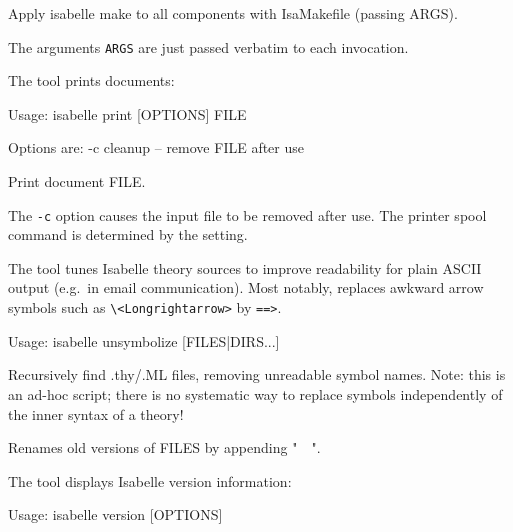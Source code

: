 \begin{isabellebody}
\begin{isamarkuptext}
\begin{ttbox}
  Apply isabelle make to all components with IsaMakefile (passing ARGS).
\end{ttbox}

  The arguments \verb|ARGS| are just passed verbatim to each
  \hyperlink{tool.make}{\mbox{}} invocation.%
\end{isamarkuptext}%
\isamarkuptrue%
%
\isamarkuptrue%
%
\begin{isamarkuptext}%
The \hypertarget{tool.print}{\hyperlink{tool.print}{\mbox{}}} tool prints documents:
\begin{ttbox}
Usage: isabelle print [OPTIONS] FILE

  Options are:
    -c           cleanup -- remove FILE after use

  Print document FILE.
\end{ttbox}

  The \verb|-c| option causes the input file to be removed
  after use.  The printer spool command is determined by the \hyperlink{setting.PRINT-COMMAND}{\mbox{}} setting.%
\end{isamarkuptext}%
\isamarkuptrue%
%
\isamarkuptrue%
%
\begin{isamarkuptext}%
The \hypertarget{tool.unsymbolize}{\hyperlink{tool.unsymbolize}{\mbox{}}} tool tunes Isabelle theory sources to
  improve readability for plain ASCII output (e.g.\ in email
  communication).  Most notably, \hyperlink{tool.unsymbolize}{\mbox{}} replaces awkward
  arrow symbols such as \verb|\|\verb|<Longrightarrow>|
  by \verb|==>|.
\begin{ttbox}
Usage: isabelle unsymbolize [FILES|DIRS...]

  Recursively find .thy/.ML files, removing unreadable symbol names.
  Note: this is an ad-hoc script; there is no systematic way to replace
  symbols independently of the inner syntax of a theory!

  Renames old versions of FILES by appending "~~".
\end{ttbox}%
\end{isamarkuptext}%
\isamarkuptrue%
%
\isamarkuptrue%
%
\begin{isamarkuptext}%
The \hypertarget{tool.version}{\hyperlink{tool.version}{\mbox{}}} tool displays Isabelle version information:
\begin{ttbox}
Usage: isabelle version [OPTIONS]


\end{ttbox}
\end{isamarkuptext}
\end{isabellebody}
